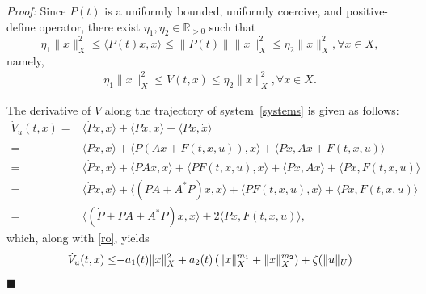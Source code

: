 \documentclass[onecolumn]{autart}
\newenvironment{proof}{{\it Proof:\enspace}}{\hfill $\blacksquare$\par}
\newenvironment{proof of Prop.ODE}{{\it Proof of Proposition~\ref{Prop.ODE}:\enspace}}{\hfill $\blacksquare$\par}
\newenvironment{proof of PDE}{{\it Proof of Proposition \ref{Prop.8}:\enspace}}{\hfill $\blacksquare$\par}
\begin{document}
{%
\begin{proof}
{Since $P(t)$ is  a uniformly   bounded, uniformly coercive, and  positive-define operator,} there exist  $\eta_1,\eta_2\in \mathbb{R}_{>0}$ such that
\begin{equation*}
	\eta_1  \|x\|^2_{ X }\leq \langle P(t)x, x \rangle\leq  \|P(t)\| \|x\|^2_{ X }\leq \eta_{2} \|x\|^2_{ X },  \forall x\in  X ,
\end{equation*}
namely,
\begin{align*}
	\eta_{1}\|x\|^{2}_{ X }\leq V(t,x)\leq\eta_{2}\|x\|^{2}_{ X }, \forall x\in X .
\end{align*}

The derivative of $V$ along the trajectory of system~\eqref{systems} is given as follows:
\begin{align*}
	\dot{V}_{u}(t,x)= & {\langle \dot{P}x, x\rangle}+\langle P\dot{x}, x\rangle+\langle Px, \dot{x}\rangle\\
	= & {\langle \dot{P}x, x\rangle}+\langle P(Ax+F(t, x, u)), x\rangle+\langle Px, Ax+F(t, x, u)\rangle\\
	= & {\langle \dot{P}x, x\rangle}+\langle PAx, x\rangle+\langle PF(t, x, u), x\rangle+\langle Px, Ax\rangle+\langle Px, F(t, x, u)\rangle\\
	= & {\langle \dot{P}x, x\rangle}+\langle (PA+A^{*}P)x, x\rangle+\langle PF(t, x, u), x\rangle+\langle Px, F(t, x, u)\rangle\\
	= & {\langle (\dot{P}+PA+A^{*}P)x, x\rangle +2\langle Px, F(t, x, u)\rangle},
\end{align*}
which, along with \eqref{ro}, yields
\begin{align*}
	\dot{V}_{u}(t, x)
	\leq&{-a_1(t)\|x\|^2_{X}+ a_2(t)\left(\|x\|^{m_1}_ X +\|x\|^{m_2}_ X \right)+ \zeta(\|u\|_{U})}\notag\\

\end{align*}
\end{proof}}
\end{document}
